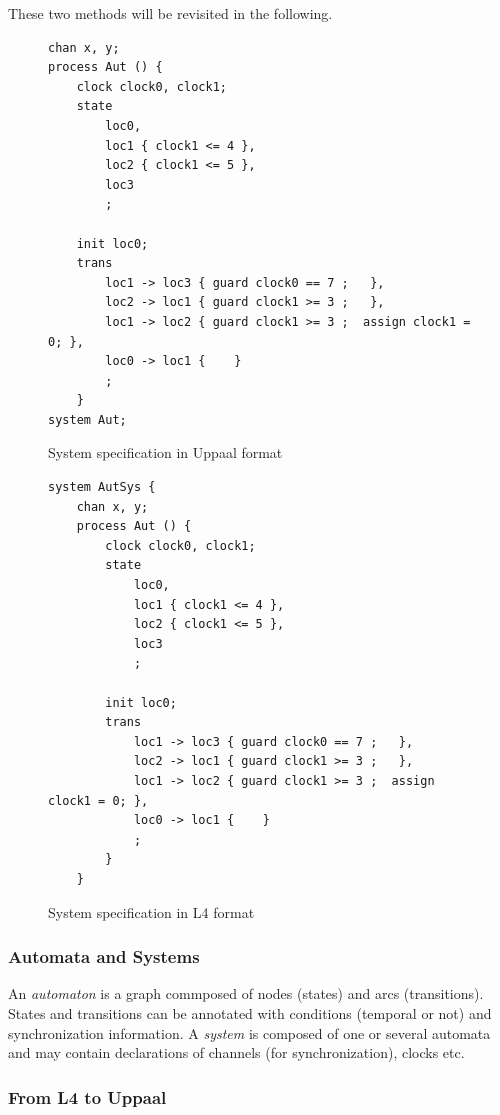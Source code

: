 These two methods will be revisited in the following.

\begin{figure}
  \begin{lstlisting}
chan x, y;
process Aut () {
    clock clock0, clock1;
    state
        loc0,
        loc1 { clock1 <= 4 },
        loc2 { clock1 <= 5 },
        loc3
        ;

    init loc0;
    trans
        loc1 -> loc3 { guard clock0 == 7 ;   },
        loc2 -> loc1 { guard clock1 >= 3 ;   },
        loc1 -> loc2 { guard clock1 >= 3 ;  assign clock1 = 0; },
        loc0 -> loc1 {    }
        ;
    }
system Aut; 
  \end{lstlisting}
  \caption{System specification in Uppaal format}\label{fig:system_uppaal}
\end{figure}

\begin{figure}
  \begin{lstlisting}
system AutSys {
    chan x, y;
    process Aut () {
        clock clock0, clock1;
        state
            loc0,
            loc1 { clock1 <= 4 },
            loc2 { clock1 <= 5 },
            loc3
            ;

        init loc0;
        trans
            loc1 -> loc3 { guard clock0 == 7 ;   },
            loc2 -> loc1 { guard clock1 >= 3 ;   },
            loc1 -> loc2 { guard clock1 >= 3 ;  assign clock1 = 0; },
            loc0 -> loc1 {    }
            ;
        }
    }
  \end{lstlisting}
  \caption{System specification in L4 format}\label{fig:system_l4}
\end{figure}



\subsubsection{Automata and Systems}

An \emph{automaton} is a graph commposed of nodes (states) and arcs
(transitions). States and transitions can be annotated with conditions
(temporal or not) and synchronization information. A \emph{system} is composed
of one or several automata and may contain declarations of channels (for
synchronization), clocks etc.


\subsubsection{From L4 to Uppaal}

